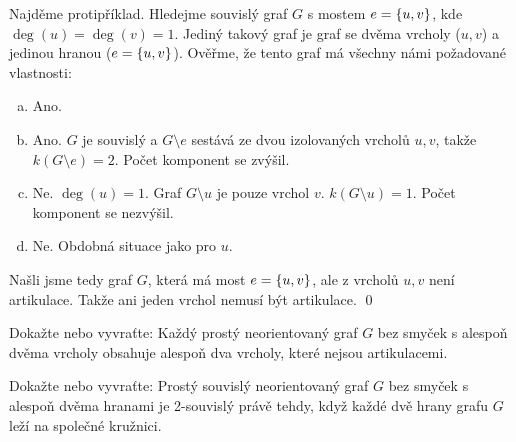 \documentclass[11pt,a4paper]{article}
\begin{document}
\begin{solution}
Najděme protipříklad. Hledejme souvislý graf $G$ s mostem $e = \left\lbrace u,v \right\rbrace$, kde $\deg(u)=\deg(v)=1$. 
Jediný takový graf je graf se dvěma vrcholy ($u,v$) a jedinou hranou ($e=\left\lbrace u,v \right\rbrace$).
Ověřme, že tento graf má všechny námi požadované vlastnosti:
\begin{enumerate}[(a)]
    \item {} Ano.
    \item {} Ano. $G$ je souvislý a $G \setminus e$ sestává ze dvou izolovaných vrcholů $u,v$, 
    takže $k(G \setminus e)=2$. Počet komponent se zvýšil.
    \item {} Ne. $\deg(u)=1$. Graf $G \setminus u$ je pouze vrchol $v$. $k(G \setminus u)=1$. Počet 
    komponent se nezvýšil.
    \item {} Ne. Obdobná situace jako pro $u$.
\end{enumerate}
Našli jsme tedy graf $G$, která má most $e = \left\lbrace u,v \right\rbrace$, ale  z vrcholů $u,v$ není artikulace. Takže ani 
jeden vrchol nemusí být artikulace.
\hspace{\fill}\qed
\end{solution}

\begin{exercise}
Dokažte nebo vyvraťte: Každý prostý neorientovaný graf $G$ bez smyček s alespoň dvěma vrcholy obsahuje alespoň dva 
vrcholy, které nejsou artikulacemi.
\end{exercise}
\begin{solution}

\end{solution}

\begin{exercise}
Dokažte nebo vyvraťte: Prostý souvislý neorientovaný graf $G$ bez smyček s alespoň dvěma hranami je 2-souvislý právě 
tehdy, když každé dvě hrany grafu $G$ leží na společné kružnici.
\end{exercise}
\begin{solution}

\end{solution}
\end{document}
